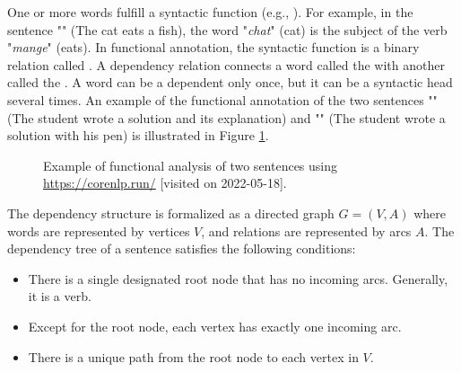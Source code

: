 \documentclass{KodeBook}
\begin{document}
One or more words fulfill a syntactic function (e.g., ). 
For example, in the sentence "" (The cat eats a fish), the word "\textit{chat}" (cat) is the subject of the verb "\textit{mange}" (eats). 
In functional annotation, the syntactic function is a binary relation called .
A dependency relation connects a word called the  with another called the . 
A word can be a dependent only once, but it can be a syntactic head several times. 
An example of the functional annotation of the two sentences "" (The student wrote a solution and its explanation) and "" (The student wrote a solution with his pen) is illustrated in Figure \ref{fig:parse-fct-exp}.
%
\begin{figure}[ht]
	\centering
	\caption[Example of functional analysis of two sentences.]{Example of functional analysis of two sentences using \url{https://corenlp.run/} [visited on 2022-05-18].}
	\label{fig:parse-fct-exp}
\end{figure}

The dependency structure is formalized as a directed graph $G=(V, A)$ where words are represented by vertices $V$, and relations are represented by arcs $A$. 
The dependency tree of a sentence satisfies the following conditions:
\begin{itemize}
	\item There is a single designated root node that has no incoming arcs. Generally, it is a verb.
	\item Except for the root node, each vertex has exactly one incoming arc.
	\item There is a unique path from the root node to each vertex in $V$.
\end{itemize}
\end{document}
